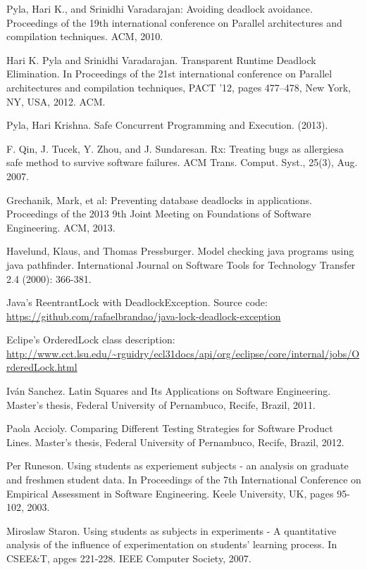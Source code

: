 \begin{thebibliography}{4}
 Pyla, Hari K., and Srinidhi Varadarajan: Avoiding deadlock avoidance.
Proceedings of the 19th international conference on Parallel architectures and compilation techniques. ACM, 2010.

 Hari K. Pyla and Srinidhi Varadarajan. Transparent Runtime Deadlock Elimination. In
Proceedings of the 21st international conference on Parallel architectures and compilation
techniques, PACT ’12, pages 477–478, New York, NY, USA, 2012. ACM.

 Pyla, Hari Krishna. Safe Concurrent Programming and Execution. (2013).

 F. Qin, J. Tucek, Y. Zhou, and J. Sundaresan. Rx: Treating bugs as
allergiesa safe method to survive software failures. ACM Trans. Comput.
Syst., 25(3), Aug. 2007.

 Grechanik, Mark, et al: Preventing database deadlocks in applications.
Proceedings of the 2013 9th Joint Meeting on Foundations of Software Engineering. ACM, 2013.

 Havelund, Klaus, and Thomas Pressburger. Model checking java programs using java pathfinder. International Journal on Software Tools for Technology Transfer 2.4 (2000): 366-381.

 Java's ReentrantLock with DeadlockException. Source code: \url{https://github.com/rafaelbrandao/java-lock-deadlock-exception}

 Eclipe's OrderedLock class description: \url{http://www.cct.lsu.edu/~rguidry/ecl31docs/api/org/eclipse/core/internal/jobs/OrderedLock.html}

 Iván Sanchez. Latin Squares and Its Applications on Software Engineering. Master's thesis, Federal University of Pernambuco, Recife, Brazil, 2011.

 Paola Accioly. Comparing Different Testing Strategies for Software Product Lines. Master's thesis, Federal University of Pernambuco, Recife, Brazil, 2012.

 Per Runeson. Using students as experiement subjects - an analysis on graduate and freshmen student data. In Proceedings of the 7th International Conference on Empirical Assessment in Software Engineering. Keele University, UK, pages 95-102, 2003.

 Miroslaw Staron. Using students as subjects in experiments - A quantitative analysis of the influence of experimentation on students' learning process. In CSEE\&T, apges 221-228. IEEE Computer Society, 2007.


\end{thebibliography}
